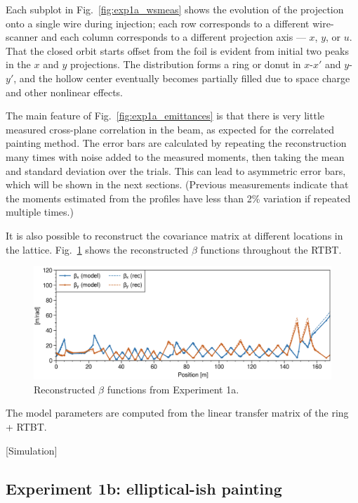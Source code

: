 %
Each subplot in Fig.~\ref{fig:exp1a_wsmeas} shows the evolution of the projection onto a single wire during injection; each row corresponds to a different wire-scanner and each column corresponds to a different projection axis — $x$, $y$, or $u$. That the closed orbit starts offset from the foil is evident from initial two peaks in the $x$ and $y$ projections. The distribution forms a ring or donut in $x$-$x'$ and $y$-$y'$, and the hollow center eventually becomes partially filled due to space charge and other nonlinear effects.

The main feature of Fig.~\ref{fig:exp1a_emittances} is that there is very little measured cross-plane correlation in the beam, as expected for the correlated painting method. The error bars are calculated by repeating the reconstruction many times with noise added to the measured moments, then taking the mean and standard deviation over the trials. This can lead to asymmetric error bars, which will be shown in the next sections. (Previous measurements indicate that the moments estimated from the profiles have less than 2\% variation if repeated multiple times.)

It is also possible to reconstruct the covariance matrix at different locations in the lattice. Fig.~\ref{fig:exp1a_rec_betas_throughout} shows the reconstructed $\beta$ functions throughout the RTBT.
%
\begin{figure}[!p]
    \centering
    \includegraphics[width=1.0\textwidth]{Images/chapter5/exp1a/rec_betas_throughout.png}
    \caption{Reconstructed $\beta$ functions from Experiment 1a.}
    \label{fig:exp1a_rec_betas_throughout}
\end{figure}
%
The model parameters are computed from the linear transfer matrix of the ring + RTBT. 


[Simulation]





\subsection{Experiment 1b: elliptical-ish painting}

